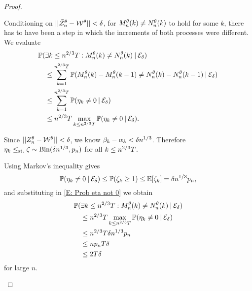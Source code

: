 \begin{proof}
\begin{proofpart}
Conditioning on $||\bar{\mathcal{Z}}^{\theta}_n - \mathcal{W}^{\theta}|| < \delta$, for $M_n^{\theta}(k) \neq N_n^{\theta}(k)$ to hold for some $k$,
there has to have been a step in which the increments of both processes were different.
We evaluate
\begin{equation} \label{E: Prob eta not 0}
\begin{aligned}
&\mathbb{P}(\exists k\leq n^{2 / 3}T: M_n^{\theta}(k) \neq N_n^{\theta}(k) \: | \: \mathcal{E}_{\delta}) \\
&\quad \leq \sum_{k=1}^{n^{2 / 3}T} \mathbb{P}( M_n^{\theta}(k) - M_n^{\theta}(k-1) \neq N_n^{\theta}(k) - N_n^{\theta}(k-1) \: | \: \mathcal{E}_{\delta}) \\
&\quad \leq \sum_{k=1}^{n^{2 / 3}T} \mathbb{P}( \eta_k \neq 0 \: | \: \mathcal{E}_{\delta}) \\
&\quad \leq n^{2 / 3}T \max_{k \leq n^{2 / 3}T} \mathbb{P}(\eta_k \neq 0 \: | \: \mathcal{E}_{\delta}).
\end{aligned}
\end{equation}

Since $||Z_n^{\theta} - \mathcal{W}^{\theta}|| < \delta$, we know $\beta_k - \alpha_k < \delta n^{1 / 3}$. Therefore
$\eta_k \leq_{\text{st.}} \zeta \sim \operatorname*{Bin}(\delta n^{1 / 3}, p_n)$ for all $k \leq n^{2 / 3}T$.

Using Markov's inequality gives
\begin{equation}
\mathbb{P}( \eta_k \neq 0 \: | \: \mathcal{E}_{\delta} ) \leq \mathbb{P}( \zeta_k \geq 1 ) \leq \mathbb{E}[\zeta_k] = \delta n^{1 / 3}p_n,
\end{equation}
and substituting in \eqref{E: Prob eta not 0} we obtain
\begin{equation}
\begin{aligned}
&\mathbb{P}(\exists k\leq n^{2 / 3}T: M_n^{\theta}(k) \neq N_n^{\theta}(k) \: | \: \mathcal{E}_{\delta}) \\
&\quad \leq n^{2 / 3}T \max_{k \leq n^{2 / 3}T} \mathbb{P}( \eta_k \neq 0 \: | \: \mathcal{E}_{\delta} ) \\
&\quad \leq n^{2 / 3}T\delta n^{1 / 3}p_n \\
&\quad \leq n p_n T \delta \\
&\quad \leq 2T\delta 
\end{aligned}
\end{equation}
for large $n$.


\end{proofpart}
\end{proof}
